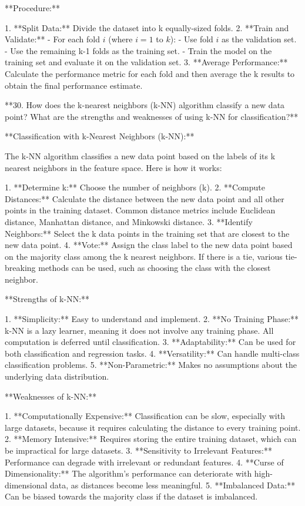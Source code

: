 **Procedure:**

1. **Split Data:** Divide the dataset into k equally-sized folds.
2. **Train and Validate:**
   - For each fold \( i \) (where \( i = 1 \) to \( k \)):
     - Use fold \( i \) as the validation set.
     - Use the remaining k-1 folds as the training set.
     - Train the model on the training set and evaluate it on the validation set.
3. **Average Performance:** Calculate the performance metric for each fold and then average the k results to obtain the final performance estimate.


 **30. How does the k-nearest neighbors (k-NN) algorithm classify a new data point? What are the strengths and weaknesses of using k-NN for classification?**

**Classification with k-Nearest Neighbors (k-NN):**

The k-NN algorithm classifies a new data point based on the labels of its k nearest neighbors in the feature space. Here is how it works:

1. **Determine k:** Choose the number of neighbors (k).
2. **Compute Distances:** Calculate the distance between the new data point and all other points in the training dataset. Common distance metrics include Euclidean distance, Manhattan distance, and Minkowski distance.
3. **Identify Neighbors:** Select the k data points in the training set that are closest to the new data point.
4. **Vote:** Assign the class label to the new data point based on the majority class among the k nearest neighbors. If there is a tie, various tie-breaking methods can be used, such as choosing the class with the closest neighbor.

**Strengths of k-NN:**

1. **Simplicity:** Easy to understand and implement.
2. **No Training Phase:** k-NN is a lazy learner, meaning it does not involve any training phase. All computation is deferred until classification.
3. **Adaptability:** Can be used for both classification and regression tasks.
4. **Versatility:** Can handle multi-class classification problems.
5. **Non-Parametric:** Makes no assumptions about the underlying data distribution.

**Weaknesses of k-NN:**

1. **Computationally Expensive:** Classification can be slow, especially with large datasets, because it requires calculating the distance to every training point.
2. **Memory Intensive:** Requires storing the entire training dataset, which can be impractical for large datasets.
3. **Sensitivity to Irrelevant Features:** Performance can degrade with irrelevant or redundant features.
4. **Curse of Dimensionality:** The algorithm's performance can deteriorate with high-dimensional data, as distances become less meaningful.
5. **Imbalanced Data:** Can be biased towards the majority class if the dataset is imbalanced.

